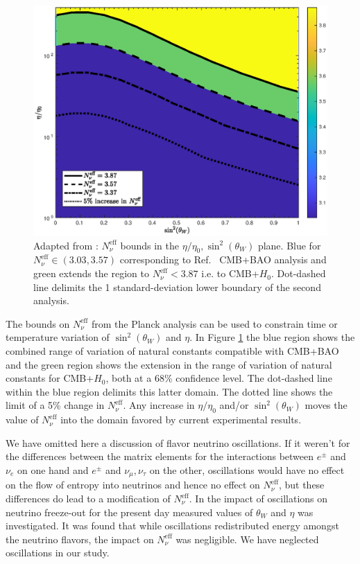 \begin{figure}%
\centerline{\includegraphics[width=\columnwidth]{04-birrell/ParametricStudies/Figures/region_plot_legend.eps}
}
\caption{Adapted from \cite{Birrell:2014uka}: $N_\nu^{\mathrm{eff}}$ bounds in the $\eta/\eta_0, \sin^2(\theta_W)$ plane. Blue for $N_\nu^{\mathrm{eff}}\in (3.03,3.57)$ corresponding to Ref.~\cite{Planck:2013pxb} CMB+BAO analysis and green extends the region to $N_\nu^{\mathrm{eff}}<3.87$ i.e. to CMB+$H_0$. Dot-dashed line delimits the 1 standard-deviation lower boundary of the second analysis.}
\label{N_nu_domain}
 \end{figure}
The bounds on $N_\nu^{\mathrm{eff}}$ from the Planck analysis \cite{Planck:2013pxb} can be  used to constrain time or temperature variation of $\sin^2(\theta_W)$ and $\eta$.  
In  Figure \ref{N_nu_domain} the blue region shows the combined range of  variation of natural constants  compatible with CMB+BAO and the green region shows  the extension in the range of  variation of  natural constants for CMB+$H_0$, both at a $68\%$ confidence level. The dot-dashed line within the blue region delimits   this latter domain. The dotted line shows the limit of a 5\% change in $N_\nu^{\mathrm{eff}}$.    Any increase in  $\eta/\eta_0$ and/or $\sin^2(\theta_W)$ moves the value of $N_\nu^{\mathrm{eff}}$ into the domain favored by current experimental results.


We have omitted here a discussion of flavor neutrino oscillations. If it weren't for the differences between the matrix elements for the interactions between $e^\pm$ and $\nu_e$ on one hand and $e^\pm$ and $\nu_\mu,\nu_\tau$ on the other, oscillations would have no effect on the flow of entropy into neutrinos and hence no effect on $N_\nu^{\mathrm{eff}}$, but these differences do lead to a modification of $N_\nu^{\mathrm{eff}}$.  In \cite{Mangano:2005cc} the impact of oscillations on neutrino freeze-out for the present day measured values of $\theta_W$ and $\eta$ was investigated.  It was found  that while oscillations redistributed energy amongst the neutrino flavors, the impact on $N_\nu^{\mathrm{eff}}$ was negligible. We have neglected oscillations in our study.



